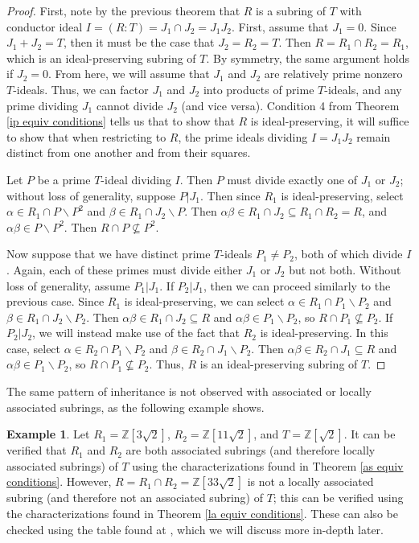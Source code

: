 \documentclass[12pt]{amsart}
\theoremstyle{definition}
\newtheorem{example}[theorem]{Example}
\newcommand{\bZ}{\mathbb Z}
\begin{document}
	\begin{proof}
		First, note by the previous theorem that $R$ is a subring of $T$ with conductor ideal $I=(R:T)=J_1\cap J_2=J_1J_2$. First, assume that $J_1=0$. Since $J_1+J_2=T$, then it must be the case that $J_2=R_2=T$. Then $R=R_1\cap R_2=R_1$, which is an ideal-preserving subring of $T$. By symmetry, the same argument holds if $J_2=0$. From here, we will assume that $J_1$ and $J_2$ are relatively prime nonzero $T$-ideals. Thus, we can factor $J_1$ and $J_2$ into products of prime $T$-ideals, and any prime dividing $J_1$ cannot divide $J_2$ (and vice versa). Condition 4 from Theorem \ref{ip equiv conditions} tells us that to show that $R$ is ideal-preserving, it will suffice to show that when restricting to $R$, the prime ideals dividing $I=J_1J_2$ remain distinct from one another and from their squares.
		
		Let $P$ be a prime $T$-ideal dividing $I$. Then $P$ must divide exactly one of $J_1$ or $J_2$; without loss of generality, suppose $P|J_1$. Then since $R_1$ is ideal-preserving, select $\alpha\in R_1\cap P\backslash P^2$ and $\beta\in R_1\cap J_2\backslash P$. Then $\alpha\beta\in R_1\cap J_2\subseteq R_1\cap R_2=R$, and $\alpha\beta\in P\backslash P^2$. Then $R\cap P\nsubseteq P^2$.
		
		Now suppose that we have distinct prime $T$-ideals $P_1\neq P_2$, both of which divide $I$. Again, each of these primes must divide either $J_1$ or $J_2$ but not both. Without loss of generality, assume $P_1|J_1$. If $P_2|J_1$, then we can proceed similarly to the previous case. Since $R_1$ is ideal-preserving, we can select $\alpha\in R_1\cap P_1\backslash P_2$ and $\beta\in R_1\cap J_2\backslash P_2$. Then $\alpha\beta\in R_1\cap J_2\subseteq R$ and $\alpha\beta\in P_1\backslash P_2$, so $R\cap P_1\nsubseteq P_2$. If $P_2|J_2$, we will instead make use of the fact that $R_2$ is ideal-preserving. In this case, select $\alpha\in R_2\cap P_1\backslash P_2$ and $\beta\in R_2\cap J_1\backslash P_2$. Then $\alpha\beta\in R_2\cap J_1\subseteq R$ and $\alpha\beta\in P_1\backslash P_2$, so $R\cap P_1\nsubseteq P_2$. Thus, $R$ is an ideal-preserving subring of $T$.
	\end{proof}
	
	The same pattern of inheritance is not observed with associated or locally associated subrings, as the following example shows.
	
	\begin{example}
		Let $R_1=\bZ[3\sqrt{2}]$, $R_2=\bZ[11\sqrt{2}]$, and $T=\bZ[\sqrt{2}]$. It can be verified that $R_1$ and $R_2$ are both associated subrings (and therefore locally associated subrings) of $T$ using the characterizations found in Theorem \ref{as equiv conditions}. However, $R=R_1\cap R_2=\bZ[33\sqrt{2}]$ is not a locally associated subring (and therefore not an associated subring) of $T$; this can be verified using the characterizations found in Theorem \ref{la equiv conditions}. These can also be checked using the table found at \cite{quadla}, which we will discuss more in-depth later.
	\end{example}
	
\end{document}
